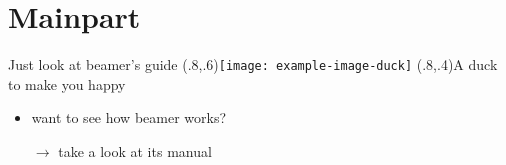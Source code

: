 \section{Mainpart}
\begin{frame}{}{Just look at beamer's guide}%
  \PlaceAt(.8,.6){\texttt{[image: example-image-duck]}}
  \PlaceAt(.8,.4){A duck to make you happy}
  \begin{itemize}
    \item want to see how beamer works?
    \item[$\rightarrow$] take a look at its manual
  \end{itemize}
\end{frame}%

